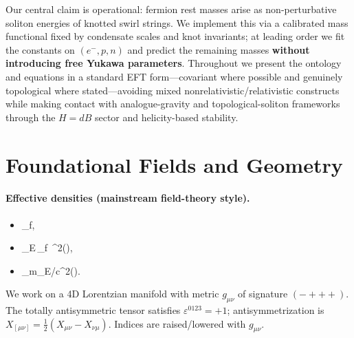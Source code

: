 \documentclass[11pt, preprint,titlepage]{revtex4-2}
\newcommand{\rhoF}{\rho_{\!f}}      %
\newcommand{\rhoE}{\rho_{\!E}}      %
\newcommand{\rhoM}{\rho_{\!m}}      %
\newcommand{\vnorm}{\lVert \mathbf{v} \rVert} %
\begin{document}
		Our central claim is operational: fermion rest masses arise as non-perturbative soliton energies of knotted swirl strings. We implement this via a calibrated mass functional fixed by condensate scales and knot invariants; at leading order we fit the constants on \((e^-,p,n)\) and predict the remaining masses \textbf{without introducing free Yukawa parameters}. Throughout we present the ontology and equations in a standard EFT form—covariant where possible and genuinely topological where stated—avoiding mixed nonrelativistic/relativistic constructs while making contact with analogue-gravity and topological-soliton frameworks through the \(H=dB\) sector and helicity-based stability.

	\section{Foundational Fields and Geometry}
	\paragraph{Effective densities (mainstream field-theory style).}
	\begin{itemize}
		\item \rhoF \equiv {},
		\item \rhoE \equiv {}\,\rhoF\,\vnorm^{2}\quad(),
		\item \rhoM \equiv \rhoE/c^{2}\quad().
	\end{itemize}


	We work on a 4D Lorentzian manifold with metric \(g_{\mu\nu}\) of signature \((-+++)\). The totally antisymmetric tensor satisfies \(\varepsilon^{0123}=+1\); antisymmetrization is \(X_{[\mu\nu]}=\tfrac12(X_{\mu\nu}-X_{\nu\mu})\). Indices are raised/lowered with \(g_{\mu\nu}\).
\end{document}
